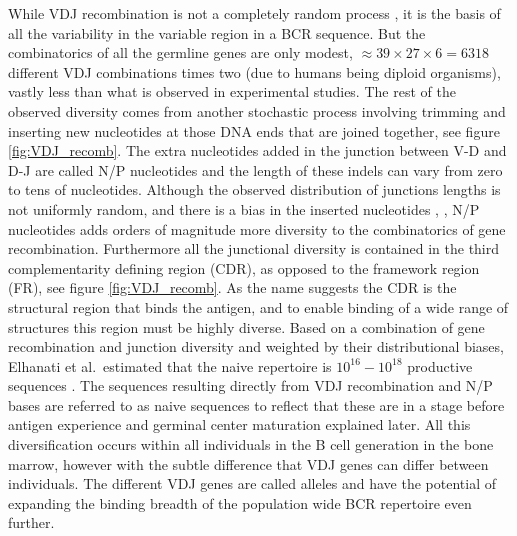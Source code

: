 While VDJ recombination is not a completely random process \cite{li2012recombinatorial}, it is the basis of all the variability in the variable region in a BCR sequence.
But the combinatorics of all the germline genes are only modest, $\approx 39\times27\times6=6318$ different VDJ combinations times two (due to humans being diploid organisms), vastly less than what is observed in experimental studies.
The rest of the observed diversity comes from another stochastic process involving trimming and inserting new nucleotides at those DNA ends that are joined together, see figure \ref{fig:VDJ_recomb}.
The extra nucleotides added in the junction between V-D and D-J are called N/P nucleotides and the length of these indels can vary from zero to tens of nucleotides.
Although the observed distribution of junctions lengths is not uniformly random, and there is a bias in the inserted nucleotides \cite{murugan2012statistical}, \cite{elhanati2015inferring}, N/P nucleotides adds orders of magnitude more diversity to the combinatorics of gene recombination.
Furthermore all the junctional diversity is contained in the third complementarity defining region (CDR), as opposed to the framework region (FR), see figure \ref{fig:VDJ_recomb}.
As the name suggests the CDR is the structural region that binds the antigen, and to enable binding of a wide range of structures this region must be highly diverse.
Based on a combination of gene recombination and junction diversity and weighted by their distributional biases, Elhanati et al.\ estimated that the naive repertoire is $10^{16} - 10^{18}$ productive sequences \cite{elhanati2015inferring}.
The sequences resulting directly from VDJ recombination and N/P bases are referred to as naive sequences to reflect that these are in a stage before antigen experience and germinal center maturation explained later.
All this diversification occurs within all individuals in the B cell generation in the bone marrow, however with the subtle difference that VDJ genes can differ between individuals.
The different VDJ genes are called alleles and have the potential of expanding the binding breadth of the population wide BCR repertoire even further.

